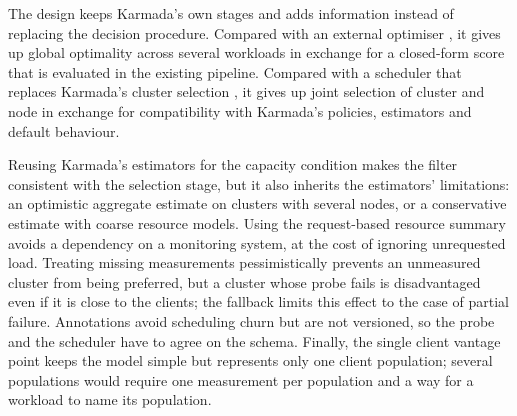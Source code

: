 The design keeps Karmada's own stages and adds information instead of replacing the decision procedure. Compared with an external optimiser \cite{tabatabaei2025cnf}, it gives up global optimality across several workloads in exchange for a closed-form score that is evaluated in the existing pipeline. Compared with a scheduler that replaces Karmada's cluster selection \cite{bregar2026cosmospan}, it gives up joint selection of cluster and node in exchange for compatibility with Karmada's policies, estimators and default behaviour.

Reusing Karmada's estimators for the capacity condition makes the filter consistent with the selection stage, but it also inherits the estimators' limitations: an optimistic aggregate estimate on clusters with several nodes, or a conservative estimate with coarse resource models. Using the request-based resource summary avoids a dependency on a monitoring system, at the cost of ignoring unrequested load. Treating missing measurements pessimistically prevents an unmeasured cluster from being preferred, but a cluster whose probe fails is disadvantaged even if it is close to the clients; the fallback limits this effect to the case of partial failure. Annotations avoid scheduling churn but are not versioned, so the probe and the scheduler have to agree on the schema. Finally, the single client vantage point keeps the model simple but represents only one client population; several populations would require one measurement per population and a way for a workload to name its population.
